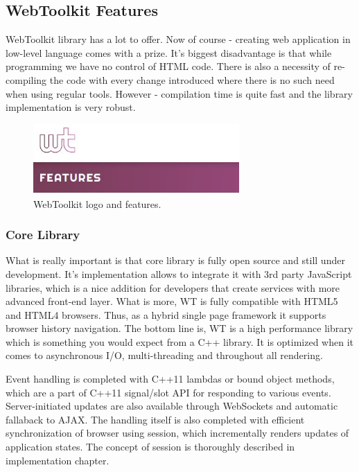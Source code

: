\documentclass[a4paper,12pt]{article}
\newcommand\tab[1][1cm]{\hspace*{#1}}
\begin{document}
{{}
\subsection{WebToolkit Features}
{
\tab WebToolkit library has a lot to offer. Now of course - creating web application in low-level language comes with a prize. It's biggest disadvantage is that while programming we have no control of HTML code. There is also a necessity of re-compiling the code with every change introduced where there is no such need when using regular tools. However - compilation time is quite fast and the library implementation is very robust. 
\begin{figure}[h]
  \centering
    \includegraphics[width=0.7\textwidth]{features}
    \caption{WebToolkit logo and features\cite{wtlogo}.}
\end{figure}

\subsubsection*{Core Library} 
{
\tab What is really important is that core library is fully open source and still under development. It's implementation allows to integrate it with 3rd party JavaScript libraries, which is a nice addition for developers that create services with more advanced front-end layer. What is more, WT is fully compatible with HTML5 and HTML4 browsers. Thus, as a hybrid single page framework it supports browser history navigation. The bottom line is, WT is a high performance library which is something you would expect from a C++ library. It is optimized when it comes to asynchronous I/O, multi-threading and throughout all rendering.

\bigskip
Event handling is completed with C++11 lambdas or bound object methods, which are a part of C++11 signal/slot API for responding to various events. Server-initiated updates are also available through WebSockets and automatic fallaback to AJAX. The handling itself is also completed with efficient synchronization of browser using session, which incrementally renders updates of application states. The concept of session is thoroughly described in implementation chapter.

}}}
\end{document}
